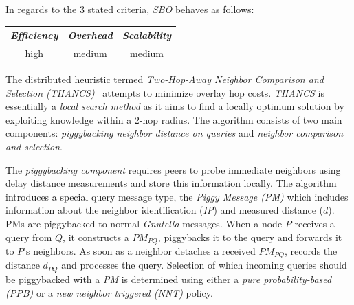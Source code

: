 %
%
In regards to the $3$ stated criteria, \emph{SBO} behaves as follows:
\begin{center}
{\footnotesize
\begin{tabular}{ccc}
\emph{Efficiency} & \emph{Overhead} & \emph{Scalability} \\
\hline
high &
medium &
%
medium
\end{tabular}
}
\end{center}


The distributed heuristic termed 
\emph{Two-Hop-Away Neighbor Comparison and Selection (THANCS)}~\cite{LNXE2005,L2008}
attempts to minimize overlay hop costs.
\emph{THANCS} is essentially a \emph{local search method} as it aims 
to find a locally optimum solution by exploiting knowledge within 
a $2$-hop radius. The algorithm consists of two main components:
\emph{piggybacking neighbor distance on queries} and
\emph{neighbor comparison and selection}.

The \emph{piggybacking component} requires peers 
to probe immediate neighbors using delay distance measurements 
and store this information locally. 
The algorithm introduces a special query message type, 
the \emph{Piggy Message (PM)} which includes information about 
the neighbor identification (\emph{IP}) and measured distance ($d$). PMs are
piggybacked to normal
{\sl Gnutella} messages. 
When a node $P$ receives a query from $Q$, it constructs a
$PM_{PQ}$, piggybacks it to the query and forwards it to $P$'s neighbors. 
As soon as a neighbor detaches a received $PM_{PQ}$, records the distance 
$d_{PQ}$ and processes the query.
Selection of which incoming queries
should be piggybacked with a \emph{PM} is determined using either a
\emph{pure probability-based (PPB)} or a \emph{new neighbor triggered (NNT)}
policy.


